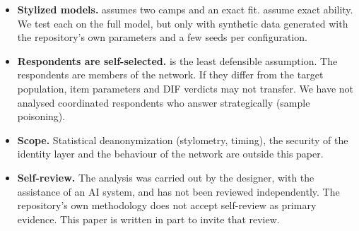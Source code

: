 \begin{itemize}
  \item \textbf{Stylized models.}  assumes two camps and an exact fit.
     assume exact ability. We test each on the full model, but only
    with synthetic data generated with the repository's own parameters and a few seeds per
    configuration.
  \item \textbf{Respondents are self-selected.}  is the least defensible
    assumption. The respondents are members of the network. If they differ from the target
    population, item parameters and DIF verdicts may not transfer. We have not analysed
    coordinated respondents who answer strategically (sample poisoning).
  \item \textbf{Scope.} Statistical deanonymization (stylometry, timing), the security of the
    identity layer and the behaviour of the network are outside this paper.
  \item \textbf{Self-review.} The analysis was carried out by the designer, with the assistance
    of an AI system, and has not been reviewed independently. The repository's own methodology
    does not accept self-review as primary evidence. This paper is written in part to invite that
    review.
\end{itemize}
